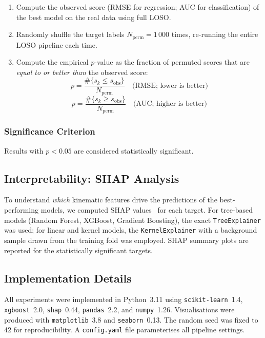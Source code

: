 \begin{enumerate}
\item Compute the observed score (RMSE for regression; AUC for
      classification) of the best model on the real data using
      full LOSO.
\item Randomly shuffle the target labels $N_{\mathrm{perm}}=1\,000$
      times, re-running the entire LOSO pipeline each time.
\item Compute the empirical $p$-value as the fraction of
      permuted scores that are \emph{equal to or better than} the
      observed score:
      \[
        p = \frac{\#\{s_k \le s_{\mathrm{obs}}\}}{N_{\mathrm{perm}}}
        \quad\text{(RMSE; lower is better)}
      \]
      \[
        p = \frac{\#\{s_k \ge s_{\mathrm{obs}}\}}{N_{\mathrm{perm}}}
        \quad\text{(AUC; higher is better)}
      \]
\end{enumerate}

\subsubsection{Significance Criterion}

Results with $p < 0.05$ are considered statistically significant.

\subsection{Interpretability: SHAP Analysis}
\label{sec:shap_method}

To understand \emph{which} kinematic features drive the predictions of the best-performing models, we computed SHAP values~\cite{lundberg2017} for each target. For tree-based models (Random Forest, XGBoost, Gradient Boosting), the exact \texttt{TreeExplainer} was used; for linear and kernel models, the \texttt{KernelExplainer} with a background sample drawn from the training fold was employed. SHAP summary plots are reported for the statistically significant targets.

\subsection{Implementation Details}

All experiments were implemented in Python~3.11 using \texttt{scikit-learn}~1.4, \texttt{xgboost}~2.0, \texttt{shap}~0.44, \texttt{pandas}~2.2, and \texttt{numpy}~1.26. Visualisations were produced with \texttt{matplotlib}~3.8 and \texttt{seaborn}~0.13. The random seed was fixed to 42 for reproducibility. A \texttt{config.yaml} file parameterises all pipeline settings.


